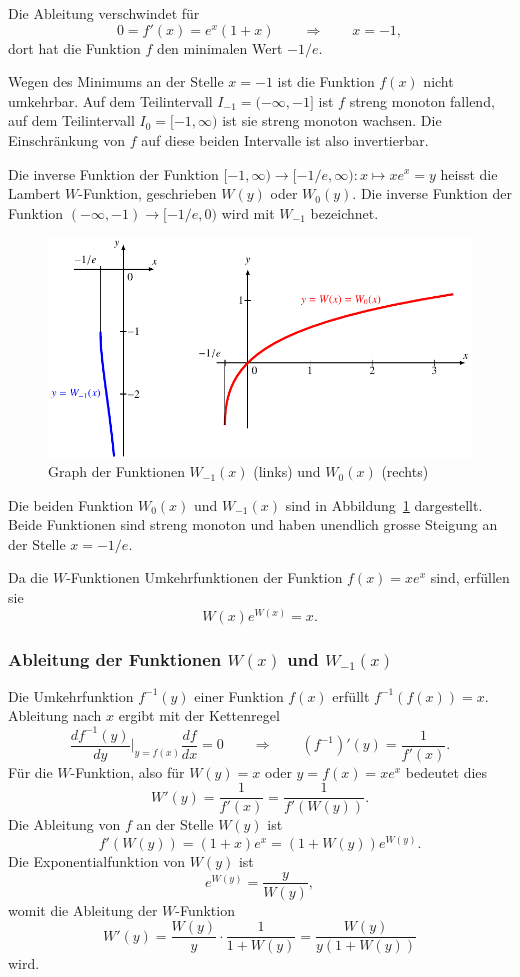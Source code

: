 Die Ableitung verschwindet für
\[
0 = f'(x) = e^x(1+x)
\qquad\Rightarrow\qquad
x=-1,
\]
dort hat die Funktion $f$ den minimalen Wert $-1/e$.

Wegen des Minimums an der Stelle $x=-1$ ist die Funktion $f(x)$ nicht
umkehrbar.
Auf dem Teilintervall $I_{-1}=(-\infty,-1]$ ist $f$ streng
monoton fallend, auf dem Teilintervall $I_0=[-1,\infty)$ ist sie
streng monoton wachsen.
Die Einschränkung von $f$ auf diese beiden Intervalle ist also
invertierbar.

\begin{definition}
Die inverse Funktion der Funktion $[-1,\infty)\to[-1/e,\infty):x\mapsto xe^x=y$
heisst die Lambert $W$-Funktion, geschrieben $W(y)$ oder $W_0(y)$.
Die inverse Funktion der Funktion $(-\infty,-1)\to[-1/e,0)$ wird mit
$W_{-1}$ bezeichnet.
\end{definition}

\begin{figure}
\centering
\includegraphics{chapters/020-exponential/images/w.pdf}
\caption{Graph der Funktionen $W_{-1}(x)$ (links) und $W_0(x)$ (rechts)
\label{buch:lambert:wgraph}}
\end{figure}
Die beiden Funktion $W_0(x)$ und $W_{-1}(x)$ sind in
Abbildung~\ref{buch:lambert:wgraph} dargestellt.
Beide Funktionen sind streng monoton und haben unendlich grosse Steigung
an der Stelle $x=-1/e$.

Da die $W$-Funktionen Umkehrfunktionen der Funktion $f(x)=xe^x$ sind,
erfüllen sie
\[
W(x) e^{W(x)} = x.
\]

\subsubsection{Ableitung der Funktionen $W(x)$ und $W_{-1}(x)$}
Die Umkehrfunktion $f^{-1}(y)$ einer Funktion $f(x)$ erfüllt
\(
f^{-1}(f(x)) = x.
\)
Ableitung nach $x$ ergibt mit der Kettenregel
\[
\frac{df^{-1}(y)}{dy}\bigg|_{y=f(x)} \frac{df}{dx} = 0
\qquad\Rightarrow\qquad
(f^{-1})'(y) = \frac{1}{f'(x)}.
\]
Für die $W$-Funktion, also für $W(y)=x$ oder $y=f(x)=xe^x$ bedeutet dies
\[
W'(y)
=
\frac{1}{f'(x)}
=
\frac{1}{f'(W(y))}.
\]
Die Ableitung von $f$ an der Stelle $W(y)$ ist
\[
f'(W(y))
=
(1+x)e^x
=
(1+W(y))e^{W(y)}.
\]
Die Exponentialfunktion von $W(y)$ ist
\[
e^{W(y)} = \frac{y}{W(y)},
\]
womit die Ableitung der $W$-Funktion
\begin{equation}
W'(y)
=
\frac{W(y)}{y}\cdot \frac{1}{1+W(y)}
=
\frac{W(y)}{y(1+W(y))}
\label{buch:lambert:eqn:ableitung}
\end{equation}
wird.

